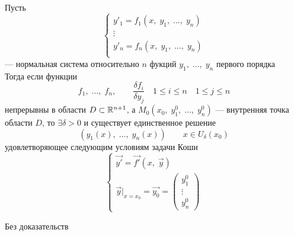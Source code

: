 \begin{Th}~\\
    Пусть 
    \[
        \begin{cases}
            y'_1 = f_1(x,\; y_1,\; \dots,\; y_n)\\
            \vdots\\
            y'_n = f_n(x,\; y_1,\; \dots,\; y_n)\\
        \end{cases}
    \]
    --- нормальная система относительно $n$ фукций $y_1,\; \dots,\; y_n$ первого порядка\\
    
    Тогда если функции
    \[
        f_1,\; \dots,\; f_n,\qquad \frac{\delta f_i}{\delta y_j} \quad 1 \leqslant i \leqslant n \quad 1\leqslant j \leqslant n
    \]
    непрерывны в области $D \subset \mathbb{R}^{n+1}$, а $M_0(x_0,\; y^0_1,\; \dots,\; y^0_n)$ --- внутренняя точка области $D$, то $\exists \delta > 0$ и существует единственное решение 
    \[
        (y_1(x),\; \dots,\; y_n(x)) \qquad x \in U_\delta(x_0)
    \] 
    удовлетворяющее следующим условиям задачи Коши
    \[
        \begin{cases}
            \vec{y'} = \vec{f'}(x,\; \vec{y})\\
            \vec{y}|_{x = x_0} = \vec{y_0} = 
            \begin{pmatrix}
                y^0_1\\
                \vdots\\
                y^0_n
            \end{pmatrix}
        \end{cases}
    \]
\end{Th} 
\begin{Proof}
    Без доказательств
\end{Proof}

